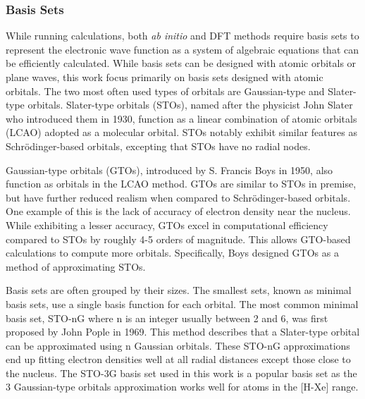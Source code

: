 \subsubsection{Basis Sets}

While running calculations, both \textit{ab initio} and DFT methods require basis sets to represent the electronic wave function as a system of algebraic equations that can be efficiently calculated.
While basis sets can be designed with atomic orbitals or plane waves, this work focus primarily on basis sets designed with atomic orbitals.
The two most often used types of orbitals are Gaussian-type and Slater-type orbitals.
Slater-type orbitals (STOs), named after the physicist John Slater who introduced them in 1930,\cite{SlaterOrbitals} function as a linear combination of atomic orbitals (LCAO) adopted as a molecular orbital. 
STOs notably exhibit similar features as Schr\"{o}dinger-based orbitals, excepting that STOs have no radial nodes.

Gaussian-type orbitals (GTOs), introduced by S. Francis Boys in 1950,\cite{GaussianOrbitals} also function as orbitals in the LCAO method.
GTOs are similar to STOs in premise, but have further reduced realism when compared to Schr\"{o}dinger-based orbitals.
One example of this is the lack of accuracy of electron density near the nucleus.
While exhibiting a lesser accuracy, GTOs excel in computational efficiency compared to STOs by roughly 4-5 orders of magnitude.
This allows GTO-based calculations to compute more orbitals.
Specifically, Boys designed GTOs as a method of approximating STOs.

Basis sets are often grouped by their sizes.
The smallest sets, known as minimal basis sets, use a single basis function for each orbital. 
The most common minimal basis set, STO-nG where n is an integer usually between 2 and 6, was first proposed by John Pople in 1969.\cite{PopleSTO}
This method describes that a Slater-type orbital can be approximated using n Gaussian orbitals.
These STO-nG approximations end up fitting electron densities well at all radial distances except those close to the nucleus.
The STO-3G basis set used in this work is a popular basis set as the 3 Gaussian-type orbitals approximation works well for atoms in the [H-Xe] range.

